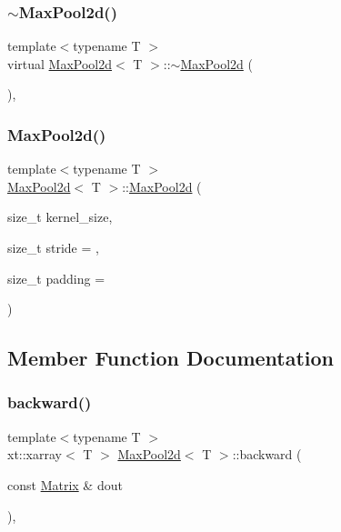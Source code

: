 \subsubsection{\texorpdfstring{$\sim$MaxPool2d()}{~MaxPool2d()}}
{\footnotesize\ttfamily template$<$typename T $>$ \\
virtual \mbox{\hyperlink{class_max_pool2d}{Max\+Pool2d}}$<$ T $>$\+::$\sim$\mbox{\hyperlink{class_max_pool2d}{Max\+Pool2d}} (\begin{DoxyParamCaption}{ }\end{DoxyParamCaption})\hspace{0.3cm}{\ttfamily [virtual]}, {\ttfamily [default]}}

\mbox{\label{class_max_pool2d_a5cfd5c6ae11f49fffb3d4a68f261f013}} 
\subsubsection{\texorpdfstring{MaxPool2d()}{MaxPool2d()}\hspace{0.1cm}{\footnotesize\ttfamily [2/2]}}
{\footnotesize\ttfamily template$<$typename T $>$ \\
\mbox{\hyperlink{class_max_pool2d}{Max\+Pool2d}}$<$ T $>$\+::\mbox{\hyperlink{class_max_pool2d}{Max\+Pool2d}} (\begin{DoxyParamCaption}\item[{size\+\_\+t}]{kernel\+\_\+size,  }\item[{size\+\_\+t}]{stride = {},  }\item[{size\+\_\+t}]{padding = {} }\end{DoxyParamCaption})}



\subsection{Member Function Documentation}
\mbox{\label{class_max_pool2d_a05cc96411753ff4c0c79a1543af9e795}} 
\subsubsection{\texorpdfstring{backward()}{backward()}}
{\footnotesize\ttfamily template$<$typename T $>$ \\
xt\+::xarray$<$ T $>$ \mbox{\hyperlink{class_max_pool2d}{Max\+Pool2d}}$<$ T $>$\+::backward (\begin{DoxyParamCaption}\item[{const \mbox{\hyperlink{class_layer_a22b1e7286096aa62bd245536c8ebdaf1}{Matrix}} \&}]{dout }\end{DoxyParamCaption})\hspace{0.3cm}{\ttfamily [override]}, {\ttfamily [virtual]}}



